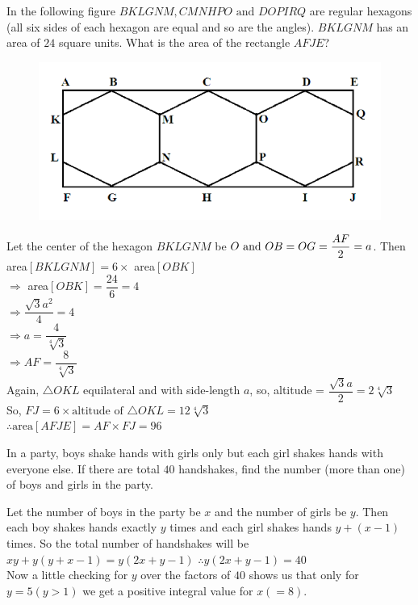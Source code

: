 \documentclass{subfile}
\begin{document}
	\begin{problem} In the following figure $BKLGNM, CMNHPO \text{ and } DOPIRQ$ are regular hexagons (all six sides of
	each hexagon are equal and so are the angles). $BKLGNM$ has an area of $24$ square units. What is the
	area of the rectangle $AFJE$?
	\begin{figure}[h]
		\centering
		\includegraphics[width=0.7\linewidth]{Prob4.png}
	\end{figure}

	\end{problem}
    \begin{solution} Let the center of the hexagon $BKLGNM$ be $O \text{ and }\\ OB=OG=\dfrac{AF}{2}=a$. Then\\
	area$[BKLGNM]=6\times$ area$[OBK]$\\
	$\Rightarrow$ area$[OBK]=\dfrac{24}{6}=4$\\
	$\Rightarrow \dfrac{\sqrt{3}a^2}{4}=4$\\
	$\Rightarrow a=\dfrac{4}{\sqrt[4]{3}}$\\
	$\Rightarrow AF=\dfrac{8}{\sqrt[4]{3}}$\\
	Again, $\triangle OKL$ equilateral and with side-length $a$,
	so, altitude = $\dfrac{\sqrt{3}a}{2}=2\sqrt[4]{3}$\\
	So, $FJ=6\times \text{altitude of } \triangle OKL=12\sqrt[4]{3}$\\
	$\therefore \text{area} [AFJE]=AF\times FJ=96$
	\end{solution}


	\begin{problem} In a party, boys shake hands with girls only but each girl shakes hands with everyone else. If there are
		total $40$ handshakes, find the number (more than one) of boys and girls in the party.


	\end{problem}



	\begin{solution}
		Let the number of boys in the party be $x$ and the number of girls be $y$. Then each boy shakes hands exactly $y$ times and each girl shakes hands $y+(x-1)$ times. So the total number of handshakes will be $xy+y(y+x-1)=y(2x+y-1)$
		$\therefore y(2x+y-1)=40$\\
		Now a little checking for  $y$ over the factors of $40$ shows us that only for $y=5(y>1)$ we get a positive integral value for $x(=8)$.\\
	\end{solution}
\end{document}
